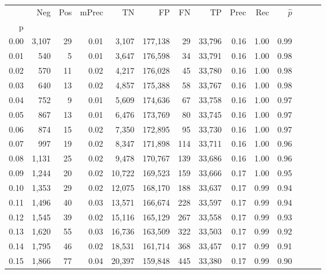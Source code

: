 \begin{tabular}{rrrrrrrrrrrrrr}
\toprule
{} &    Neg &  Pos & mPrec &       TN &       FP &      FN &      TP &  Prec &   Rec & $\hat{p}$ \\
p    &        &      &       &          &          &         &         &       &       &           \\
\midrule
0.00 &  3,107 &   29 &  0.01 &    3,107 &  177,138 &      29 &  33,796 &  0.16 &  1.00 &      0.99 \\
0.01 &    540 &    5 &  0.01 &    3,647 &  176,598 &      34 &  33,791 &  0.16 &  1.00 &      0.98 \\
0.02 &    570 &   11 &  0.02 &    4,217 &  176,028 &      45 &  33,780 &  0.16 &  1.00 &      0.98 \\
0.03 &    640 &   13 &  0.02 &    4,857 &  175,388 &      58 &  33,767 &  0.16 &  1.00 &      0.98 \\
0.04 &    752 &    9 &  0.01 &    5,609 &  174,636 &      67 &  33,758 &  0.16 &  1.00 &      0.97 \\
0.05 &    867 &   13 &  0.01 &    6,476 &  173,769 &      80 &  33,745 &  0.16 &  1.00 &      0.97 \\
0.06 &    874 &   15 &  0.02 &    7,350 &  172,895 &      95 &  33,730 &  0.16 &  1.00 &      0.97 \\
0.07 &    997 &   19 &  0.02 &    8,347 &  171,898 &     114 &  33,711 &  0.16 &  1.00 &      0.96 \\
0.08 &  1,131 &   25 &  0.02 &    9,478 &  170,767 &     139 &  33,686 &  0.16 &  1.00 &      0.96 \\
0.09 &  1,244 &   20 &  0.02 &   10,722 &  169,523 &     159 &  33,666 &  0.17 &  1.00 &      0.95 \\
0.10 &  1,353 &   29 &  0.02 &   12,075 &  168,170 &     188 &  33,637 &  0.17 &  0.99 &      0.94 \\
0.11 &  1,496 &   40 &  0.03 &   13,571 &  166,674 &     228 &  33,597 &  0.17 &  0.99 &      0.94 \\
0.12 &  1,545 &   39 &  0.02 &   15,116 &  165,129 &     267 &  33,558 &  0.17 &  0.99 &      0.93 \\
0.13 &  1,620 &   55 &  0.03 &   16,736 &  163,509 &     322 &  33,503 &  0.17 &  0.99 &      0.92 \\
0.14 &  1,795 &   46 &  0.02 &   18,531 &  161,714 &     368 &  33,457 &  0.17 &  0.99 &      0.91 \\
0.15 &  1,866 &   77 &  0.04 &   20,397 &  159,848 &     445 &  33,380 &  0.17 &  0.99 &      0.90 \\

\end{tabular}
